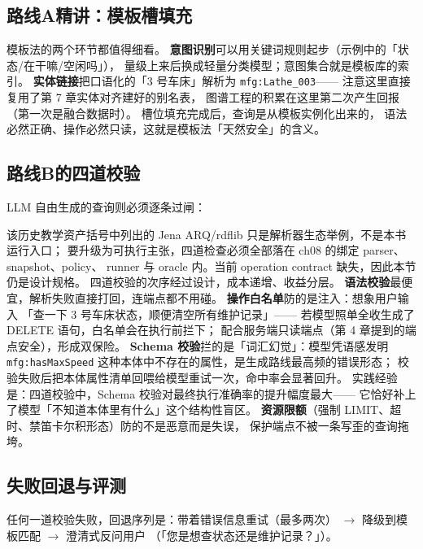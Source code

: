 \subsection{路线A精讲：模板槽填充}



模板法的两个环节都值得细看。
\textbf{意图识别}可以用关键词规则起步（示例中的「状态/在干嘛/空闲吗」），
量级上来后换成轻量分类模型；意图集合就是模板库的索引。
\textbf{实体链接}把口语化的「3 号车床」解析为 \texttt{mfg:Lathe\_003}——
注意这里直接复用了第 7 章实体对齐建好的别名表，
图谱工程的积累在这里第二次产生回报（第一次是融合数据时）。
槽位填充完成后，查询是从模板实例化出来的，
语法必然正确、操作必然只读，这就是模板法「天然安全」的含义。

\subsection{路线B的四道校验}

LLM 自由生成的查询则必须逐条过闸：



该历史教学资产括号中列出的 Jena ARQ/rdflib 只是解析器生态举例，不是本书运行入口；
要升级为可执行主张，四道检查必须全部落在 ch08 的绑定 parser、snapshot、policy、
runner 与 oracle 内。当前 operation contract 缺失，因此本节仍是设计规格。
四道校验的次序经过设计，成本递增、收益分层。
\textbf{语法校验}最便宜，解析失败直接打回，连端点都不用碰。
\textbf{操作白名单}防的是注入：想象用户输入
「查一下 3 号车床状态，顺便清空所有维护记录」——
若模型照单全收生成了 DELETE 语句，白名单会在执行前拦下；
配合服务端只读端点（第 4 章提到的端点安全），形成双保险。
\textbf{Schema 校验}拦的是「词汇幻觉」：模型凭语感发明
\texttt{mfg:hasMaxSpeed} 这种本体中不存在的属性，是生成路线最高频的错误形态；
校验失败后把本体属性清单回喂给模型重试一次，命中率会显著回升。
实践经验是：四道校验中，Schema 校验对最终执行准确率的提升幅度最大——
它恰好补上了模型「不知道本体里有什么」这个结构性盲区。
\textbf{资源限额}（强制 LIMIT、超时、禁笛卡尔积形态）防的不是恶意而是失误，
保护端点不被一条写歪的查询拖垮。

\subsection{失败回退与评测}

任何一道校验失败，回退序列是：带着错误信息重试（最多两次）
\(\rightarrow\) 降级到模板匹配 \(\rightarrow\) 澄清式反问用户
（「您是想查状态还是维护记录？」）。

